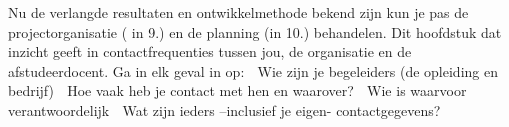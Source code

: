 Nu de verlangde resultaten en ontwikkelmethode bekend zijn kun je pas de projectorganisatie ( in 9.) en de planning (in 10.) behandelen. Dit hoofdstuk dat inzicht geeft in contactfrequenties tussen jou, de organisatie en de afstudeerdocent. Ga in elk geval in op:
 Wie zijn je begeleiders (de opleiding en bedrijf)
 Hoe vaak heb je contact met hen en waarover?
 Wie is waarvoor verantwoordelijk
 Wat zijn ieders –inclusief je eigen- contactgegevens?